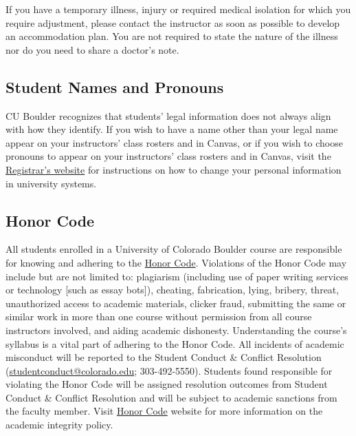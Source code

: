 \documentclass[11pt]{memoir}
\begin{document}
If you have a temporary illness, injury or required medical isolation for which you require adjustment, please contact the instructor as soon as possible to develop an accommodation plan. You are not required to state the nature of the illness nor do you need to share a doctor's note.

\subsection{Student Names and Pronouns}
CU Boulder recognizes that students' legal information does not always align with how they identify. If you wish to have a name other than your legal name appear on your instructors’ class rosters and in Canvas, or if you wish to choose pronouns to appear on your instructors’ class rosters and in Canvas, visit the \href{https://www.colorado.edu/registrar/students/records/info/preferred}{Registrar’s website} for instructions on how to change your personal information in university systems.

\subsection{Honor Code}
All students enrolled in a University of Colorado Boulder course are responsible for knowing and adhering to the \href{http://www.colorado.edu/policies/academic-integrity-policy}{Honor Code}. Violations of the Honor Code may include but are not limited to: plagiarism (including use of paper writing services or technology [such as essay bots]), cheating, fabrication, lying, bribery, threat, unauthorized access to academic materials, clicker fraud, submitting the same or similar work in more than one course without permission from all course instructors involved, and aiding academic dishonesty. Understanding the course's syllabus is a vital part of adhering to the Honor Code. All incidents of academic misconduct will be reported to the Student Conduct \& Conflict Resolution (\href{mailto:studentconduct@colorado.edu}{studentconduct@colorado.edu}; 303-492-5550). Students found responsible for violating the Honor Code will be assigned resolution outcomes from Student Conduct \& Conflict Resolution and will be subject to academic sanctions from the faculty member. Visit \href{https://www.colorado.edu/sccr/students/honor-code-and-student-code-conduct}{Honor Code} website for more information on the academic integrity policy. 
\end{document}
